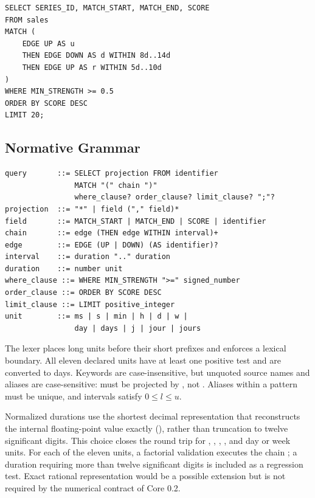 \begin{lstlisting}
SELECT SERIES_ID, MATCH_START, MATCH_END, SCORE
FROM sales
MATCH (
    EDGE UP AS u
    THEN EDGE DOWN AS d WITHIN 8d..14d
    THEN EDGE UP AS r WITHIN 5d..10d
)
WHERE MIN_STRENGTH >= 0.5
ORDER BY SCORE DESC
LIMIT 20;
\end{lstlisting}

\subsection{Normative Grammar}

\begin{lstlisting}[language={},basicstyle=\ttfamily\footnotesize]
query       ::= SELECT projection FROM identifier
                MATCH "(" chain ")"
                where_clause? order_clause? limit_clause? ";"?
projection  ::= "*" | field ("," field)*
field       ::= MATCH_START | MATCH_END | SCORE | identifier
chain       ::= edge (THEN edge WITHIN interval)+
edge        ::= EDGE (UP | DOWN) (AS identifier)?
interval    ::= duration ".." duration
duration    ::= number unit
where_clause ::= WHERE MIN_STRENGTH ">=" signed_number
order_clause ::= ORDER BY SCORE DESC
limit_clause ::= LIMIT positive_integer
unit        ::= ms | s | min | h | d | w |
                day | days | j | jour | jours
\end{lstlisting}

The lexer places long units before their short prefixes and enforces a lexical boundary. All eleven declared units have at least one positive test and are converted to days. Keywords are case-insensitive, but unquoted source names and aliases are case-sensitive:  must be projected by , not . Aliases within a pattern must be unique, and intervals satisfy $0\leq l\leq u$.

Normalized durations use the shortest decimal representation that reconstructs the internal floating-point value exactly (), rather than truncation to twelve significant digits. This choice closes the round trip for , , , , and day or week units. For each of the eleven units, a factorial validation executes the chain ; a duration requiring more than twelve significant digits is included as a regression test. Exact rational representation would be a possible extension but is not required by the numerical contract of Core 0.2.

